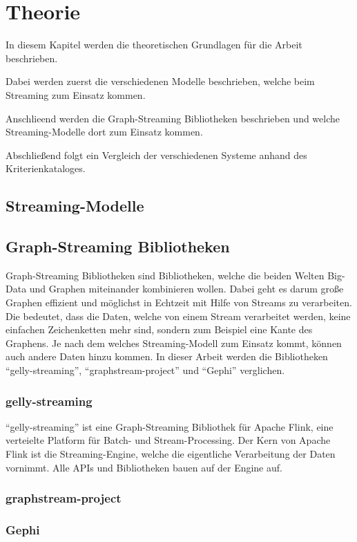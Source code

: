 \chapter{Theorie}
In diesem Kapitel werden die theoretischen Grundlagen für die Arbeit beschrieben.

Dabei werden zuerst die verschiedenen Modelle beschrieben, welche beim Streaming
zum Einsatz kommen.

Anschlieend werden die Graph-Streaming Bibliotheken beschrieben und welche
Streaming-Modelle dort zum Einsatz kommen.

Abschließend folgt ein Vergleich der verschiedenen Systeme anhand des
Kriterienkataloges.

\section{Streaming-Modelle}
\section{Graph-Streaming Bibliotheken}
Graph-Streaming Bibliotheken sind Bibliotheken, welche die beiden Welten Big-Data
und Graphen miteinander kombinieren wollen. Dabei geht es darum große Graphen
effizient und möglichst in Echtzeit mit Hilfe von Streams zu verarbeiten. Die
bedeutet, dass die Daten, welche von einem Stream verarbeitet werden, keine
einfachen Zeichenketten mehr sind, sondern zum Beispiel eine Kante des Graphens.
Je nach dem welches Streaming-Modell zum Einsatz kommt, können auch andere Daten
hinzu kommen. In dieser Arbeit werden die Bibliotheken \enquote{gelly-streaming},
\enquote{graphstream-project} und \enquote{Gephi} verglichen.

\subsection{gelly-streaming}
\enquote{gelly-streaming} ist eine Graph-Streaming Bibliothek für Apache Flink,
eine verteielte Platform für Batch- und Stream-Processing. Der Kern von
Apache Flink ist die Streaming-Engine, welche die eigentliche Verarbeitung der
Daten vornimmt. Alle APIs und Bibliotheken bauen auf der Engine auf.

\subsection{graphstream-project}
\subsection{Gephi}
